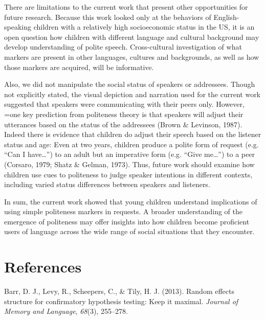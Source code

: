 \documentclass[10pt, letterpaper]{article}
\begin{document}
There are limitations to the current work that present other
opportunities for future research. Because this work looked only at the
behaviors of English-speaking children with a relatively high
socioeconomic status in the US, it is an open question how children with
different language and cultural background may develop understanding of
polite speech. Cross-cultural investigation of what markers are present
in other languages, cultures and backgrounds, as well as how those
markers are acquired, will be informative.

Also, we did not manipulate the social status of speakers or addressees.
Though not explicitly stated, the visual depiction and narration used
for the current work suggested that speakers were communicating with
their peers only. However, =one key prediction from politeness theory is
that speakers will adjust their utterances based on the status of the
addressees (Brown \& Levinson, 1987). Indeed there is evidence that
children do adjust their speech based on the listener status and age:
Even at two years, children produce a polite form of request (e.g. ``Can
I have\ldots{}'') to an adult but an imperative form (e.g. ``Give
me\ldots{}'') to a peer (Corsaro, 1979; Shatz \& Gelman, 1973). Thus,
future work should examine how children use cues to politeness to judge
speaker intentions in different contexts, including varied status
differences between speakers and listeners.

In sum, the current work showed that young children understand
implications of using simple politeness markers in requests. A broader
understanding of the emergence of politeness may offer insights into how
children become proficient users of language across the wide range of
social situations that they encounter.

\vspace{1em}
\vspace{1em} \noindent

\section{References}\label{references}

\setlength{\parindent}{-0.1in} \setlength{\leftskip}{0.125in} \noindent

\hypertarget{refs}{}
\hypertarget{ref-barr2013}{}
Barr, D. J., Levy, R., Scheepers, C., \& Tily, H. J. (2013). Random
effects structure for confirmatory hypothesis testing: Keep it maximal.
\emph{Journal of Memory and Language}, \emph{68}(3), 255--278.
\end{document}
